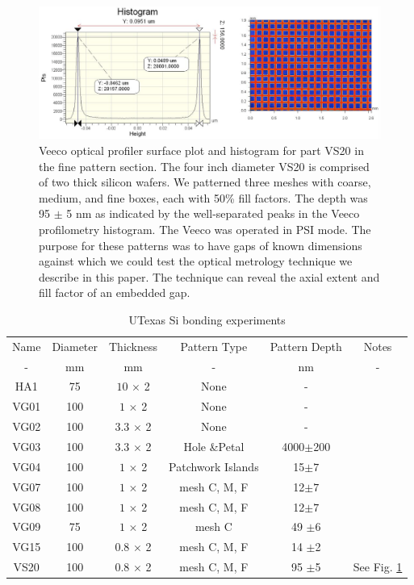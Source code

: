 \documentclass[osajnl,preprint,showpacs,superscriptaddress,12pt]{revtex4-1} %
\begin{document}
\begin{figure}[htbp]
\centerline{\includegraphics[width=1.0\columnwidth]{figs/VS20fineGapCrop.pdf}}
\caption{Veeco optical profiler surface plot and histogram for part VS20 in the fine pattern section\label{figVS20pattern}.  The four inch diameter VS20 is comprised of two thick silicon wafers.  We patterned three meshes with coarse, medium, and fine boxes, each with 50\% fill factors.  The depth was 95 $\pm$ 5 nm as indicated by the well-separated peaks in the Veeco profilometry histogram.  The Veeco was operated in PSI mode.  The purpose for these patterns was to have gaps of known dimensions against which we could test the optical metrology technique we describe in this paper.  The technique can reveal the axial extent and fill factor of an embedded gap.  }
\end{figure}


\begin{table}[h!]
\caption{UTexas Si bonding experiments \label{tabbondexper}}
\begin{center}
    \begin{tabular}{ c c c c c c}
    \hline
    Name & Diameter & Thickness & Pattern Type & Pattern Depth & Notes \\ 
    -  & mm & mm & - & nm & - \\ 
        \hline
    HA1     & 75   & $10$ $\times$ 2& None & - & \\
    VG01   & 100 &$1$ $\times$ 2 & None  & - &  \\
    VG02   & 100 & $3.3$ $\times$ 2 &  None  & - &  \\
    VG03   & 100 & $3.3$ $\times$ 2 &  Hole \&Petal & 4000$\pm$200 & \\    
    VG04   & 100 & $1$ $\times$ 2 &  Patchwork Islands & 15$\pm7$ & \\
    VG07   & 100 & $1$ $\times$ 2 &  mesh C, M, F & 12$\pm7$ & \\ %
    VG08   & 100 & $1$ $\times$ 2 &  mesh C, M, F & 12$\pm7$ & \\ 
    VG09   & 75   & $1$ $\times$ 2 & mesh C & 49 $\pm$6 & \\
    VG15   & 100 & $0.8$ $\times$ 2 &  mesh C, M, F  &14 $\pm$2 & \\
    VS20   & 100 & $0.8$ $\times$ 2 &  mesh C, M, F & 95 $\pm$5 & See Fig. \ref{figVS20pattern}\\
    \hline
    \end{tabular}
\end{center}
\end{table}
\end{document}
